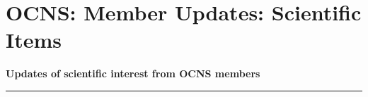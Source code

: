 \section*{OCNS: Member Updates: Scientific Items}%
\textbf{\large Updates of scientific interest from OCNS members\\}
\rule{\textwidth}{0.4pt}


\nocite{*}
\printbibliography[heading=none]

